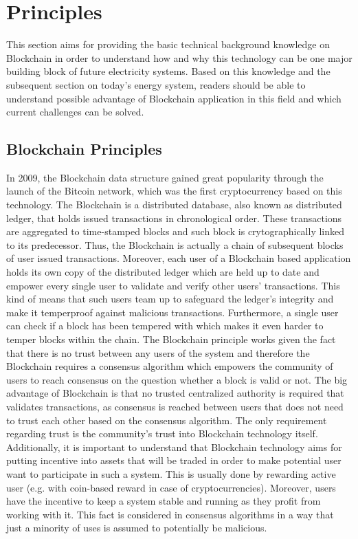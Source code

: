 \documentclass[runningheads]{llncs}
\begin{document}
\section{Principles}
This section aims for providing the basic technical background knowledge on Blockchain in order to understand how and why this technology can be one major building block of future electricity systems. Based on this knowledge and the subsequent section on today's energy system, readers should be able to understand possible advantage of Blockchain application in this field and which current challenges can be solved.

\subsection{Blockchain Principles}
In 2009, the Blockchain data structure gained great popularity through the launch of the Bitcoin network, which was the first cryptocurrency based on this technology. The Blockchain is a distributed database, also known as distributed ledger, that holds issued transactions in chronological order. These transactions are aggregated to time-stamped blocks and such block is crytographically linked to its predecessor. Thus, the Blockchain is actually a chain of subsequent blocks of user issued transactions. Moreover, each user of a Blockchain based application holds its own copy of the distributed ledger which are held up to date and empower every single user to validate and verify other users' transactions. This kind of means that such users team up to safeguard the ledger's integrity and make it temperproof against malicious transactions. Furthermore, a single user can check if a block has been tempered with which makes it even harder to temper blocks within the chain. \newline
The Blockchain principle works given the fact that there is no trust between any users of the system and therefore the Blockchain requires a consensus algorithm which empowers the community of users to reach consensus on the question whether a block is valid or not. The big advantage of Blockchain is that no trusted centralized authority is required that validates transactions, as consensus is reached between users that does not need to trust each other based on the consensus algorithm. The only requirement regarding trust is the community's trust into Blockchain technology itself. Additionally, it is important to understand that Blockchain technology aims for putting incentive into assets that will be traded in order to make potential user want to participate in such a system. This is usually done by rewarding active user (e.g. with coin-based reward in case of cryptocurrencies). Moreover, users have the incentive to keep a system stable and running as they profit from working with it. This fact is considered in consensus algorithms in a way that just a minority of uses is assumed to potentially be malicious. \cite{blockchain} \cite{andoni_energy_bc_review}
\end{document}

